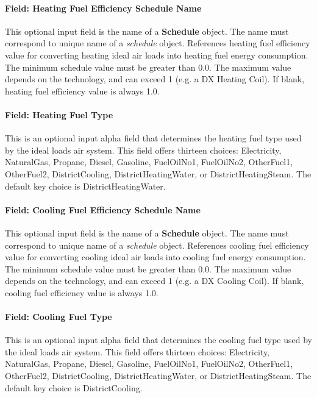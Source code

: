 \paragraph{Field: Heating Fuel Efficiency Schedule Name}\label{field-heating-fuel-efficiency-schedule-name}

This optional input field is the name of a \textbf{Schedule} object. The name must correspond to unique name of a \textit{schedule} object. References heating fuel efficiency value for converting heating ideal air loads into heating fuel energy consumption. The minimum schedule value must be greater than 0.0. The maximum value depends on the technology, and can exceed 1 (e.g. a DX Heating Coil). If blank, heating fuel efficiency value is always 1.0.

\paragraph{Field: Heating Fuel Type}\label{field-heating-fuel-type}

This is an optional input alpha field that determines the heating fuel type used by the ideal loads air system. This field offers thirteen choices: Electricity, NaturalGas, Propane, Diesel, Gasoline, FuelOilNo1, FuelOilNo2, OtherFuel1, OtherFuel2, DistrictCooling, DistrictHeatingWater, or DistrictHeatingSteam. The default key choice is DistrictHeatingWater.

\paragraph{Field: Cooling Fuel Efficiency Schedule Name}\label{field-cooling-fuel-efficiency-schedule-name}

This optional input field is the name of a \textbf{Schedule} object. The name must correspond to unique name of a \textit{schedule} object. References cooling fuel efficiency value for converting cooling ideal air loads into cooling fuel energy consumption. The minimum schedule value must be greater than 0.0. The maximum value depends on the technology, and can exceed 1 (e.g. a DX Cooling Coil). If blank, cooling fuel efficiency value is always 1.0.

\paragraph{Field: Cooling Fuel Type}\label{field-cooling-fuel-type}

This is an optional input alpha field that determines the cooling fuel type used by the ideal loads air system. This field offers thirteen choices: Electricity, NaturalGas, Propane, Diesel, Gasoline, FuelOilNo1, FuelOilNo2, OtherFuel1, OtherFuel2, DistrictCooling, DistrictHeatingWater, or DistrictHeatingSteam. The default key choice is DistrictCooling.

